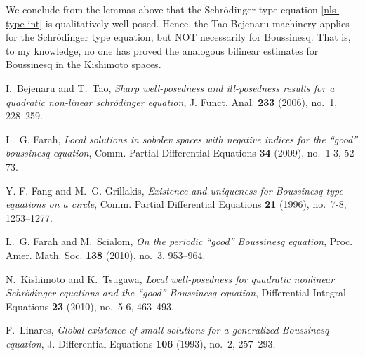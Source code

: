 \documentclass{amsart}
\begin{document}
%
%
We conclude from the lemmas above that the Schr\"odinger type equation \eqref{nls-type-int} is
qualitatively well-posed. Hence, the Tao-Bejenaru machinery applies for the
Schr\"odinger type equation, but NOT necessarily for Boussinesq. That is, to
my knowledge, no one has proved the analogous bilinear estimates for Boussinesq
in the Kishimoto spaces. 
%
\providecommand{\bysame}{\leavevmode\hbox to3em{\hrulefill}\thinspace}
\providecommand{\MR}{\relax\ifhmode\unskip\space\fi MR }
\providecommand{\MRhref}[2]{%
  \href{http://www.ams.org/mathscinet-getitem?mr=#1}{#2}
}
\providecommand{\href}[2]{#2}
\begin{thebibliography}{Far09}

I.~Bejenaru and T.~Tao, \emph{Sharp well-posedness and ill-posedness results
  for a quadratic non-linear schr{\"o}dinger equation}, J. Funct. Anal.
  \textbf{233} (2006), no.~1, 228--259.

L.~G. Farah, \emph{Local solutions in sobolev spaces with negative indices for
  the ``good'' boussinesq equation}, Comm. Partial Differential Equations
  \textbf{34} (2009), no.~1-3, 52--73.

Y.-F. Fang and M.~G. Grillakis, \emph{Existence and uniqueness for {B}oussinesq
  type equations on a circle}, Comm. Partial Differential Equations \textbf{21}
  (1996), no.~7-8, 1253--1277. 

L.~G. Farah and M.~Scialom, \emph{On the periodic ``good'' {B}oussinesq
  equation}, Proc. Amer. Math. Soc. \textbf{138} (2010), no.~3, 953--964.
  

N.~Kishimoto and K.~Tsugawa, \emph{Local well-posedness for quadratic nonlinear
  {S}chr{\"o}dinger equations and the ``good'' {B}oussinesq equation},
  Differential Integral Equations \textbf{23} (2010), no.~5-6, 463--493.
  

F.~Linares, \emph{Global existence of small solutions for a generalized
  {B}oussinesq equation}, J. Differential Equations \textbf{106} (1993), no.~2,
  257--293. 

\end{thebibliography}
%
%
%
\end{document}
